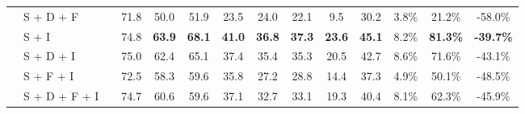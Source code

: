 \begin{table*}[t]
\begin{tabular}{@{}lllcccccccc|ccc@{}}
                                                                                        & S + D + F              &                                                                           & 71.8                                & 50.0            & 51.9              & 23.5           & 24.0          & 22.1               & 9.5            & 30.2                                         & 3.8\%                                         & 21.2\%                                     & -58.0\%                                    \\
                                                                                        & S + I                  &                                                                           & 74.8                                & \textbf{63.9}   & \textbf{68.1}     & \textbf{41.0}  & \textbf{36.8} & \textbf{37.3}      & \textbf{23.6}  & \textbf{45.1}                                & 8.2\%                                         & \textbf{81.3\%}                            & \textbf{-39.7\%}                           \\
                                                                                        & S + D + I              &                                                                           & 75.0                                & 62.4            & 65.1              & 37.4           & 35.4          & 35.3               & 20.5           & 42.7                                         & 8.6\%                                         & 71.6\%                                     & -43.1\%                                    \\
                                                                                        & S + F + I              &                                                                           & 72.5                                & 58.3            & 59.6              & 35.8           & 27.2          & 28.8               & 14.4           & 37.3                                         & 4.9\%                                         & 50.1\%                                     & -48.5\%                                    \\
                                                                                        & S + D + F + I          &                                                                           & 74.7                                & 60.6            & 59.6              & 37.1           & 32.7          & 33.1               & 19.3           & 40.4                                         & 8.1\%                                         & 62.3\%                                     & -45.9\%                                    \\ \midrule

\end{tabular}
\end{table*}
